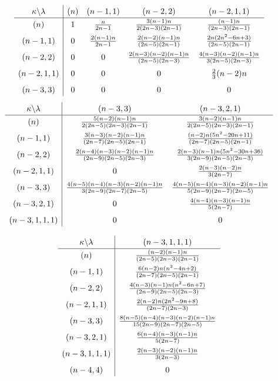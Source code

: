 \documentclass[10pt,oneside,american]{amsart}
\numberwithin{equation}{section}
\numberwithin{figure}{section}
\theoremstyle{plain}
\theoremstyle{definition}
\theoremstyle{remark}
\theoremstyle{plain}
\theoremstyle{definition}
\theoremstyle{plain}
\theoremstyle{plain}
\begin{document}
\begin{table}[H]
\[
 \def\arraystretch{1.3}
\begin{array}{c|cccc}
\kappa\backslash\lambda & (n) & (n-1,1) & (n-2,2) & (n-2,1,1)\\
\hline (n) & 1 & \frac{n}{2n-1} & \frac{3(n-1)n}{2(2n-3)(2n-1)} & \frac{(n-1)n}{(2n-3)(2n-1)}\\[1ex]
(n-1,1) & 0 & \frac{2(n-1)n}{2n-1} & \frac{2(n-2)(n-1)n}{(2n-5)(2n-1)} & \frac{2n(2n^{2}-6n+3)}{(2n-5)(2n-1)}\\[1ex]
(n-2,2) & 0 & 0 & \frac{2(n-3)(n-2)(n-1)n}{(2n-5)(2n-3)} & \frac{4(n-3)(n-2)(n-1)n}{3(2n-5)(2n-3)}\\[1ex]
(n-2,1,1) & 0 & 0 & 0 & \frac{2}{3}(n-2)n\\[1ex]
(n-3,3) & 0 & 0 & 0 & 0
\end{array}
\]
\[
 \def\arraystretch{1.3}
\begin{array}{c|cc}
\kappa\backslash\lambda & (n-3,3) & (n-3,2,1)\\
\hline (n) & \frac{5(n-2)(n-1)n}{2(2n-5)(2n-3)(2n-1)} & \frac{3(n-2)(n-1)n}{2(2n-5)(2n-3)(2n-1)}\\[1ex]
(n-1,1) & \frac{3(n-3)(n-2)(n-1)n}{(2n-7)(2n-5)(2n-1)} & \frac{(n-2)n(5n^{2}-20n+11)}{(2n-7)(2n-5)(2n-1)}\\[1ex]
(n-2,2) & \frac{2(n-4)(n-3)(n-2)(n-1)n}{(2n-9)(2n-5)(2n-3)} & \frac{2(n-3)(n-1)n(5n^{2}-30n+36)}{3(2n-9)(2n-5)(2n-3)}\\[1ex]
(n-2,1,1) & 0 & \frac{2(n-3)(n-2)n}{3(2n-7)}\\[1ex]
(n-3,3) & \frac{4(n-5)(n-4)(n-3)(n-2)(n-1)n}{3(2n-9)(2n-7)(2n-5)} & \frac{4(n-5)(n-4)(n-3)(n-2)(n-1)n}{5(2n-9)(2n-7)(2n-5)}\\[1ex]
(n-3,2,1) & 0 & \frac{4(n-4)(n-3)(n-1)n}{5(2n-7)}\\[1ex]
(n-3,1,1,1) & 0 & 0
\end{array}
\]

\[
 \def\arraystretch{1.3}
\begin{array}{c|c}
\kappa\backslash\lambda & (n-3,1,1,1)\\
\hline (n) & \frac{(n-2)(n-1)n}{(2n-5)(2n-3)(2n-1)}\\[1ex]
(n-1,1) & \frac{6(n-2)n(n^{2}-4n+2)}{(2n-7)(2n-5)(2n-1)}\\[1ex]
(n-2,2) & \frac{4(n-3)(n-1)n(n^{2}-6n+7)}{(2n-9)(2n-5)(2n-3)}\\[1ex]
(n-2,1,1) & \frac{2(n-2)n(2n^{2}-9n+8)}{(2n-7)(2n-3)}\\[1ex]
(n-3,3) & \frac{8(n-5)(n-4)(n-3)(n-2)(n-1)n}{15(2n-9)(2n-7)(2n-5)}\\[1ex]
(n-3,2,1) & \frac{6(n-4)(n-3)(n-1)n}{5(2n-7)}\\[1ex]
(n-3,1,1,1) & \frac{2(n-3)(n-2)(n-1)n}{3(2n-3)}\\[1ex]
(n-4,4) & 0
\end{array}
\]
\caption{Coefficients $c_{\kappa,\lambda}$ for some of the lexicographically
largest partitions of~$n$; the lower table continues the upper one
to the right.}
\label{tab:cn1} 
\end{table}
\end{document}
